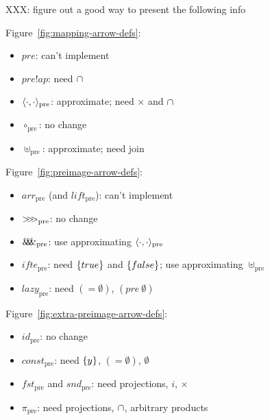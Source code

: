 \documentclass[preprint]{sigplanconf}
\newcommand{\arrowlift}{\ensuremath{lift}}
\newcommand{\arrowarr}{\ensuremath{arr}}
\newcommand{\arrowcomp}{\ensuremath{{>}\mspace{-6mu}{>}\mspace{-6mu}{>}}}
\newcommand{\arrowpair}{\ensuremath{\mathit{\&\mspace{-7.5mu}\&\mspace{-7.5mu}\&}}}
\newcommand{\arrowif}{\ensuremath{ifte}}
\newcommand{\arrowlazy}{\ensuremath{lazy}}
\newcommand{\pre}{_\mathrm{pre}}
\newcommand{\liftpre}{\arrowlift\pre}
\newcommand{\arrpre}{\arrowarr\pre}
\newcommand{\comppre}{\arrowcomp\pre}
\newcommand{\pairpre}{\arrowpair\pre}
\newcommand{\ifpre}{\arrowif\pre}
\newcommand{\lazypre}{\arrowlazy\pre}
\begin{document}
XXX: figure out a good way to present the following info

Figure~\ref{fig:mapping-arrow-defs}:
\begin{itemize}
	\item $pre$: can't implement
	\item $pre!ap$: need $\cap$
	\item $\pair{\cdot,\cdot}\pre$: approximate; need $\times$ and $\cap$
	\item $\circ\pre$: no change
	\item $\uplus\pre$: approximate; need join
\end{itemize}

Figure~\ref{fig:preimage-arrow-defs}:
\begin{itemize}
	\item $\arrpre$ (and $\liftpre$): can't implement
	\item $\comppre$: no change
	\item $\pairpre$: use approximating $\pair{\cdot,\cdot}\pre$
	\item $\ifpre$: need $\{{true}\}$ and $\{{false}\}$; use approximating $\uplus\pre$
	\item $\lazypre$: need $(= \emptyset)$, $(pre~\emptyset)$
\end{itemize}

Figure~\ref{fig:extra-preimage-arrow-defs}:
\begin{itemize}
	\item $id\pre$: no change
	\item $const\pre$: need $\{{y}\}$, $(= \emptyset)$, $\emptyset$
	\item $fst\pre$ and $snd\pre$: need projections, $i$, $\times$
	\item $\pi\pre$: need projections, $\cap$, arbitrary products
\end{itemize}
\end{document}

